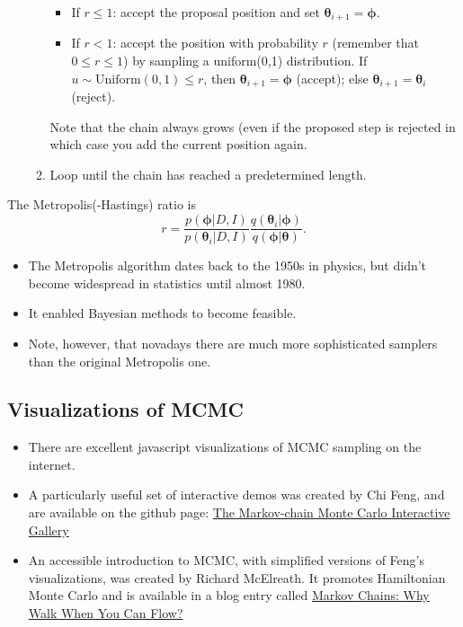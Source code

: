 \documentclass[%
oneside,                 %
final,                   %
10pt]{article}
\begin{document}
\begin{enumerate}
\begin{enumerate}
\begin{itemize}
    \item If $r \leq 1$: accept the proposal position and set $\boldsymbol{\theta}_{i+1} = \boldsymbol{\phi}$.

    \item If $r < 1$: accept the position with probability $r$ (remember that $0 \leq r \leq 1$) by sampling a uniform(0,1) distribution. If $u \sim \mathrm{Uniform}(0,1) \leq r$, then $\boldsymbol{\theta}_{i+1} = \boldsymbol{\phi}$ (accept); else $\boldsymbol{\theta}_{i+1} = \boldsymbol{\theta}_i$ (reject).
\end{itemize}

\noindent
    Note that the chain always grows (even if the proposed step is rejected in which case you add the current position again.

 \item Loop until the chain has reached a predetermined length.
\end{enumerate}

\noindent
\end{enumerate}

\noindent
The Metropolis(-Hastings) ratio is
    \[
    r = \frac{p( \boldsymbol{\phi} | D,I)}{p( \boldsymbol{\theta}_i | D,I)}
    \frac{q( \boldsymbol{\theta}_i | \boldsymbol{\phi} )}{q( \boldsymbol{\phi} | \boldsymbol{\theta} )}.
    \]

\begin{itemize}
\item The Metropolis algorithm dates back to the 1950s in physics, but didn't become widespread in statistics until almost 1980.

\item It enabled Bayesian methods to become feasible.

\item Note, however, that novadays there are much more sophisticated samplers than the original Metropolis one.
\end{itemize}

\noindent
\subsection{Visualizations of MCMC}
\begin{itemize}
\item There are excellent javascript visualizations of MCMC sampling on the internet.

\item A particularly useful set of interactive demos was created by Chi Feng, and are available on the github page: \href{{https://chi-feng.github.io/mcmc-demo/}}{The Markov-chain Monte Carlo Interactive Gallery}

\item An accessible introduction to MCMC, with simplified versions of Feng's visualizations, was created by Richard McElreath. It promotes Hamiltonian Monte Carlo and is available in a blog entry called \href{{http://elevanth.org/blog/2017/11/28/build-a-better-markov-chain/}}{Markov Chains: Why Walk When You Can Flow?} 
\end{itemize}
\end{document}
